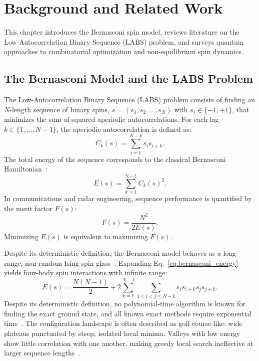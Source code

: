 \documentclass[12pt,a4paper]{report}
\begin{document}
\chapter{Background and Related Work}
\label{ch:background}

This chapter introduces the Bernasconi spin model, reviews literature on the Low-Autocorrelation Binary Sequence (LABS) problem, and surveys quantum approaches to combinatorial optimization and non-equilibrium spin dynamics.

\section{The Bernasconi Model and the LABS Problem}
\label{sec:bernasconi_model}
The Low-Autocorrelation Binary Sequence (LABS) problem consists of finding an $N$-length sequence of binary spins, $s = (s_1, s_2, \dots, s_N)$ with $s_i \in \{-1, +1\}$, that minimizes the sum of squared aperiodic autocorrelations. For each lag $k \in \{1, \dots, N-1\}$, the aperiodic autocorrelation is defined as:
\begin{equation}
    C_k(s) = \sum_{i=1}^{N-k} s_i s_{i+k}.
    \label{eq:autocorrelation}
\end{equation}
The total energy of the sequence corresponds to the classical Bernasconi Hamiltonian~\cite{bernasconi1987, mertens1998}:
\begin{equation}
    E(s) = \sum_{k=1}^{N-1} C_k(s)^2.
    \label{eq:bernasconi_energy}
\end{equation}
In communications and radar engineering, sequence performance is quantified by the merit factor $F(s)$:
\begin{equation}
    F(s) = \frac{N^2}{2E(s)}.
    \label{eq:merit_factor}
\end{equation}
Minimizing $E(s)$ is equivalent to maximizing $F(s)$.

Despite its deterministic definition, the Bernasconi model behaves as a long-range, non-random Ising spin glass~\cite{mertens1998, packebusch2016, marinari1994}. Expanding Eq.~\eqref{eq:bernasconi_energy} yields four-body spin interactions with infinite range:
\begin{equation}
    E(s) = \frac{N(N-1)}{2} + 2 \sum_{k=1}^{N-1} \sum_{1 \le i < j \le N-k} s_i s_{i+k} s_j s_{j+k}.
    \label{eq:expanded_energy}
\end{equation}
Despite its deterministic definition, no polynomial-time algorithm is known for finding the exact ground state, and all known exact methods require exponential time~\cite{packebusch2016}. The configuration landscape is often described as golf-course-like: wide plateaus punctuated by steep, isolated local minima. Valleys with low energy show little correlation with one another, making greedy local search ineffective at larger sequence lengths~\cite{mertens1996, prestwich2007}.
\end{document}
